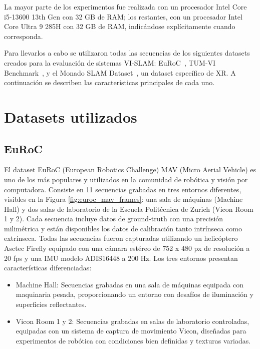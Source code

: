 La mayor parte de los experimentos fue realizada con un procesador Intel Core i5-13600 13th Gen con 32 GB de RAM; los restantes, con un procesador Intel Core Ultra 9 285H con 32 GB de RAM, indicándose explícitamente cuando corresponda.

Para llevarlos a cabo se utilizaron todas las secuencias de los siguientes datasets creados para la evaluación de sistemas VI-SLAM: EuRoC~\cite{burri2016euroc}, TUM-VI Benchmark~\cite{schubert2018tum}, y el Monado SLAM Dataset~\cite{demayo2025monadoslamdataset}, un dataset específico de XR. A continuación se describen las características principales de cada uno.

\section{Datasets utilizados} \label{sec:datasets}

\subsection*{EuRoC}
El dataset EuRoC (European Robotics Challenge) MAV (Micro Aerial Vehicle) es uno de los más populares y utilizados en la comunidad de robótica y visión por computadora. Consiste en 11 secuencias grabadas en tres entornos diferentes, visibles en la Figura \ref{fig:euroc_mav_frames}: una sala de máquinas (Machine Hall) y dos salas de laboratorio de la Escuela Politécnica de Zurich (Vicon Room 1 y 2). Cada secuencia incluye datos de ground-truth con una precisión milimétrica y están disponibles los datos de calibración tanto intrínseca como extrínseca. Todas las secuencias fueron capturadas utilizando un helicóptero Asctec Firefly equipado con una cámara estéreo de 752 x 480 px de resolución a 20 fps y una IMU modelo ADIS16448 a 200 Hz. Los tres entornos presentan características diferenciadas:
\begin{itemize}
    \item Machine Hall: Secuencias grabadas en una sala de máquinas equipada con maquinaria pesada, proporcionando un entorno con desafíos de iluminación y superficies reflectantes.
    \item Vicon Room 1 y 2: Secuencias grabadas en salas de laboratorio controladas, equipadas con un sistema de captura de movimiento Vicon, diseñadas para experimentos de robótica con condiciones bien definidas y texturas variadas.
\end{itemize}

